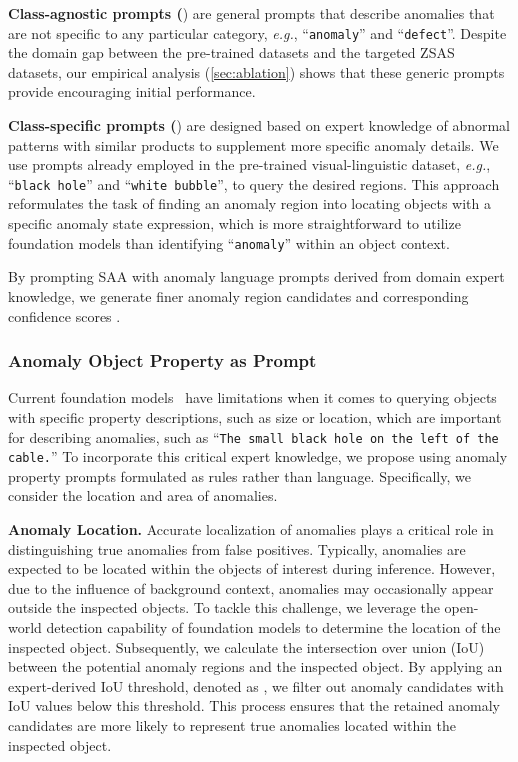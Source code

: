 \documentclass{article}
\begin{document}
\noindent \textbf{Class-agnostic prompts (}) are general prompts that describe anomalies that are not specific to any particular category, \textit{e.g.}, ``\verb|anomaly|'' and ``\verb|defect|''. Despite the domain gap between the pre-trained datasets and the targeted ZSAS datasets, our empirical analysis (\ref{sec:ablation}) shows that these generic prompts provide  encouraging initial performance.

\noindent \textbf{Class-specific prompts (}) are designed based on expert knowledge of abnormal patterns with similar products to supplement more specific anomaly details.
We use prompts already employed in the pre-trained visual-linguistic dataset, \textit{e.g.}, ``\verb|black hole|'' and ``\verb|white bubble|'', to query the desired regions. This approach reformulates the task of finding an anomaly region into locating objects with a specific anomaly state expression, which is more straightforward to utilize foundation models than identifying ``\verb|anomaly|'' within an object context.

By prompting SAA with anomaly language prompts  derived from domain expert knowledge, we generate finer anomaly region candidates  and corresponding confidence scores . 




\subsubsection{Anomaly Object Property as Prompt}

Current foundation models~\cite{liu2023grounding, li2021grounded} have limitations when it comes to querying objects with specific property descriptions, such as size or location, which are important for describing anomalies, such as ``\verb|The small black hole on the left of the cable.|'' To incorporate this critical expert knowledge, we propose using anomaly property prompts formulated as rules rather than language. Specifically, we consider the location and area of anomalies.

\noindent\textbf{Anomaly Location.} Accurate localization of anomalies plays a critical role in distinguishing true anomalies from false positives. Typically, anomalies are expected to be located within the objects of interest during inference. However, due to the influence of background context, anomalies may occasionally appear outside the inspected objects. To tackle this challenge, we leverage the open-world detection capability of foundation models to determine the location of the inspected object. Subsequently, we calculate the intersection over union (IoU) between the potential anomaly regions and the inspected object. By applying an expert-derived IoU threshold, denoted as , we filter out anomaly candidates with IoU values below this threshold. This process ensures that the retained anomaly candidates are more likely to represent true anomalies located within the inspected object.
\end{document}

